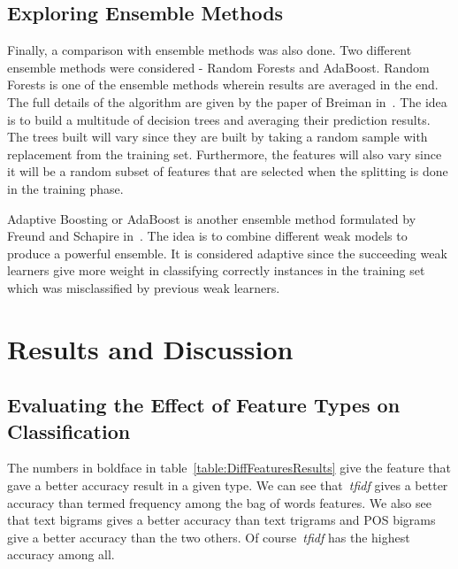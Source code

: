 \documentclass[a4paper]{llncs}
\begin{document}
\subsection{Exploring Ensemble Methods}
Finally, a comparison with ensemble methods was also done. Two different ensemble methods were considered - Random Forests and AdaBoost. Random Forests is one of the ensemble methods wherein results are averaged in the end. The full details of the algorithm are given by the paper of Breiman in~\cite{breiman2001random}. The idea is to build a multitude of decision trees and averaging their prediction results. The trees built will vary since they are built by taking a random sample with replacement from the training set. Furthermore, the features will also vary since it will be a random subset of features that are selected when the splitting is done in the training phase. 

Adaptive Boosting or AdaBoost is another ensemble method formulated by Freund and Schapire in~\cite{freund1997decision}. The idea is to combine different weak models to produce a powerful ensemble. It is considered adaptive since the succeeding weak learners give more weight in classifying correctly instances in the training set which was misclassified by previous weak learners. 

\section{Results and Discussion}
\subsection{Evaluating the Effect of Feature Types on Classification}
The numbers in boldface in table~\ref{table:DiffFeaturesResults} give the feature that gave a better accuracy result in a given type. We can see that~\textit{tfidf} gives a better accuracy than termed frequency among the bag of words features. We also see that text bigrams gives a better accuracy than text trigrams and POS bigrams give a better accuracy than the two others. Of course~\textit{tfidf} has the highest accuracy among all. 
\end{document}
